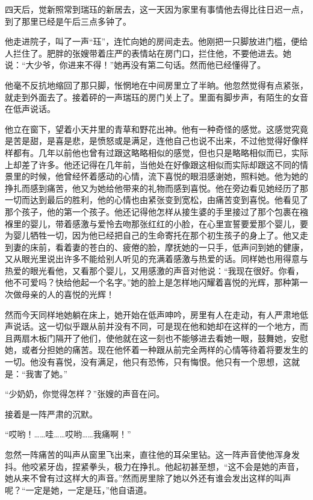 \par 四天后，觉新照常到瑞珏的新居去，这一天因为家里有事情他去得比往日迟一点，到了那里已经是午后三点多钟了。
\par 他走进院子，叫了一声“珏”，连忙向她的房间走去。他刚把一只脚放进门槛，便给人拦住了。肥胖的张嫂带着庄严的表情站在房门口，拦住他，不要他进去。她说：“大少爷，你进来不得！”她再没有第二句话。然而他已经懂得了。
\par 他毫不反抗地缩回了那只脚，怅惘地在中间房里立了半晌。他忽然觉得有点紧张，就走到外面去了。接着砰的一声瑞珏的房门关上了。里面有脚步声，有陌生的女音在低声说话。
\par 他立在窗下，望着小天井里的青草和野花出神。他有一种奇怪的感觉。这感觉究竟是苦是甜，是喜是悲，是愤怒或是满足，连他自己也说不出来，不过他觉得好像样样都有。几年以前他也曾有过跟这略略相似的感觉，但也只是略略相似而已，实际上却差了许多。他还记得在几年前，当他处在好像跟这相似而实际却跟这不同的情景里的时候，他曾经怀着感动的心情，流下喜悦的眼泪感谢她，照料她。他为她的挣扎而感到痛苦，他又为她给他带来的礼物而感到喜悦。他在旁边看见她经历了那一切而达到最后的胜利，他的心情也由紧张变到宽松，由痛苦变到喜悦。他看见了那个孩子，他的第一个孩子。他还记得他怎样从接生婆的手里接过了那个包裹在襁褓里的婴儿，带着感激与爱怜去吻那张红红的小脸，在心里宣誓要爱那个婴儿，要为婴儿牺牲一切，因为他已经把自己的生命寄托在那个初生孩子的身上了。他又走到妻的床前，看着妻的苍白的、疲倦的脸，摩抚她的一只手，低声问到她的健康，又从眼光里说出许多不能给别人听见的充满着感激与热爱的话。同样她也用得意与热爱的眼光看他，又看那个婴儿，又用感激的声音对他说：“我现在很好。你看，他不可爱吗？快给他起一个名字。”她的脸上是怎样地闪耀着喜悦的光辉，那种第一次做母亲的人的喜悦的光辉！
\par 然而今天同样地她躺在床上，她开始在低声呻吟，房里有人在走动，有人严肃地低声说话。这一切似乎跟从前并没有不同，可是现在他和她却在这样的一个地方，而且两扇木板门隔开了他们，使他就在这一刻也不能够进去看她一眼，鼓舞她，安慰她，或者分担她的痛苦。现在他怀着一种跟从前完全两样的心情等待着将要发生的一切。他没有喜悦，没有满足，他只有恐怖，只有悔恨。他只有一个思想，这就是：“我害了她。”
\par “少奶奶，你觉得怎样？”张嫂的声音在问。
\par 接着是一阵严肃的沉默。
\par “哎哟！……哇……哎哟……我痛啊！”
\par 忽然一阵痛苦的叫声从窗里飞出来，直往他的耳朵里钻。这一阵声音使他浑身发抖。他咬紧牙齿，捏紧拳头，极力在挣扎。他起初甚至想，“这不会是她的声音，她从来不曾有过这样大的声音。”然而房里除了她以外还有谁会发出这样的叫声呢？“一定是她，一定是珏，”他自语道。
